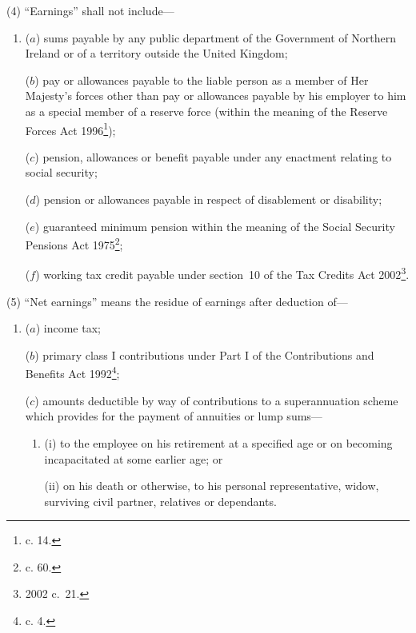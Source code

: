 \documentclass[12pt,a4paper]{article}
\begin{document}
(4) “Earnings” shall not include—
\begin{enumerate}\item[]
($a$) sums payable by any public department of the Government of Northern Ireland or of a territory outside the United Kingdom;

($b$) pay or allowances payable to the liable person as a member of Her Majesty’s forces
other than pay or allowances payable by his employer to him as a special member of a reserve force (within the meaning of the Reserve Forces Act 1996\footnote{ c. 14.});  %

($c$) pension, allowances or benefit payable under any enactment relating to social security;

($d$) pension or allowances payable in respect of disablement or disability;

($e$) guaranteed minimum pension within the meaning of the Social Security Pensions Act 1975\footnote{ c. 60.};

($f$) working tax credit payable under section~10 of the Tax Credits Act 2002\footnote{2002 c.\ 21.}.
\end{enumerate}

(5) “Net earnings” means the residue of earnings after deduction of—
\begin{enumerate}\item[]
($a$) income tax;

($b$) primary class I contributions under Part I of the Contributions and Benefits Act 1992\footnote{ c. 4.};

($c$) amounts deductible by way of contributions to a superannuation scheme which provides for the payment of annuities or 
lump %
sums—
\begin{enumerate}\item[]
(i) to the employee on his retirement at a specified age or on becoming incapacitated at some earlier age; or

(ii) on his death or otherwise, to his personal representative, widow, 
surviving civil partner,  %
relatives or dependants.
\end{enumerate}
\end{enumerate}
\end{document}
